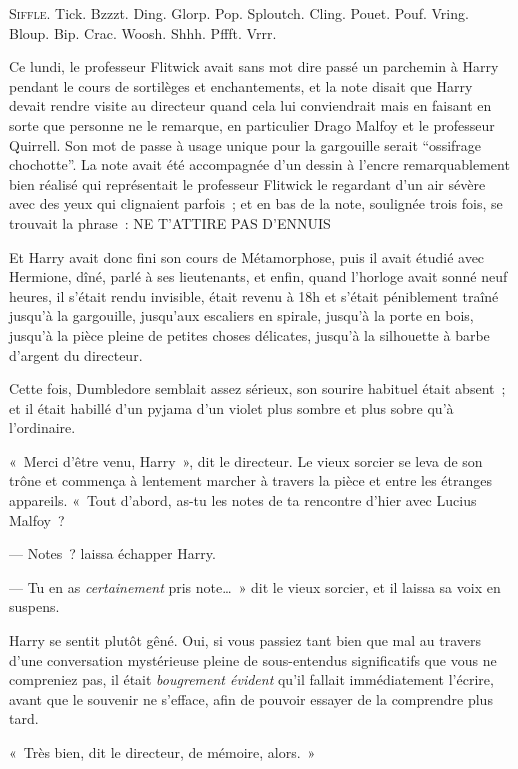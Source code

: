 
\lettrine{S}{iffle}.  Tick. Bzzzt. Ding. Glorp. Pop. Sploutch. Cling. Pouet. Pouf. Vring. Bloup. Bip. Crac. Woosh. Shhh. Pffft. Vrrr.

Ce lundi, le professeur Flitwick avait sans mot dire passé un parchemin à Harry pendant le cours de sortilèges et enchantements, et la note disait que Harry devait rendre visite au directeur quand cela lui conviendrait mais en faisant en sorte que personne ne le remarque, en particulier Drago Malfoy et le professeur Quirrell. Son mot de passe à usage unique pour la gargouille serait “ossifrage chochotte”. La note avait été accompagnée d'un dessin à l'encre remarquablement bien réalisé qui représentait le professeur Flitwick le regardant d'un air sévère avec des yeux qui clignaient parfois~; et en bas de la note, soulignée trois fois, se trouvait la phrase~: NE T'ATTIRE PAS D'ENNUIS

Et Harry avait donc fini son cours de Métamorphose, puis il avait étudié avec Hermione, dîné, parlé à ses lieutenants, et enfin, quand l'horloge avait sonné neuf heures, il s'était rendu invisible, était revenu à 18h et s'était péniblement traîné jusqu'à la gargouille, jusqu'aux escaliers en spirale, jusqu'à la porte en bois, jusqu'à la pièce pleine de petites choses délicates, jusqu'à la silhouette à barbe d'argent du directeur.

Cette fois, Dumbledore semblait assez sérieux, son sourire habituel était absent~; et il était habillé d'un pyjama d'un violet plus sombre et plus sobre qu'à l'ordinaire.

«~Merci d'être venu, Harry~», dit le directeur. Le vieux sorcier se leva de son trône et commença à lentement marcher à travers la pièce et entre les étranges appareils. «~Tout d'abord, as-tu les notes de ta rencontre d'hier avec Lucius Malfoy~?

--- Notes~? laissa échapper Harry.

--- Tu en as \emph{certainement} pris note…~» dit le vieux sorcier, et il laissa sa voix en suspens.

Harry se sentit plutôt gêné. Oui, si vous passiez tant bien que mal au travers d'une conversation mystérieuse pleine de sous-entendus significatifs que vous ne compreniez pas, il était \emph{bougrement évident} qu'il fallait immédiatement l'écrire, avant que le souvenir ne s'efface, afin de pouvoir essayer de la comprendre plus tard.

«~Très bien, dit le directeur, de mémoire, alors.~»

